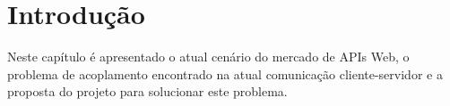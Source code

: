 \chapter{Introdução}

Neste capítulo é apresentado o atual cenário do mercado de APIs Web, o problema de acoplamento encontrado na atual comunicação cliente-servidor e a proposta do projeto para solucionar este problema.





